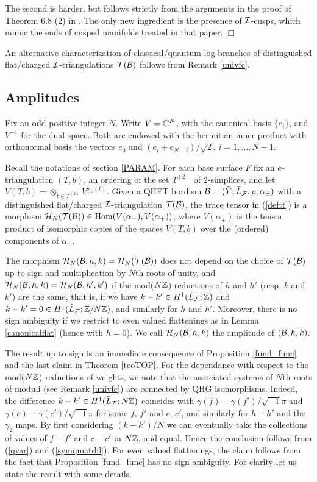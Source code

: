 The second is harder, but follows strictly from the arguments in
the proof of Theorem 6.8 (2) in \cite{BB2}. The only new
ingredient is the presence of ${\mathcal I}$-cusps, which mimic the ends of
cusped manifolds treated in that paper. \hfill$\Box$

An alternative characterization of classical/quantum log-branches
of distinguished flat/charged ${\mathcal I}$-triangulations ${\mathcal T}({\mathcal B})$
follows from Remark \ref{univfc}.
\subsection{Amplitudes}\label{QHFTTENS} Fix an odd positive integer $N$.
Write $V={\mathbb C}^N$, with the canonical basis $\{e_i\}$, and $V^{-1}$
for the dual space. Both are endowed with the hermitian inner
product with orthonormal basis the vectors $e_0$ and
$(e_i+e_{N-i})/\sqrt{2}$, $i=1,\ldots,N-1$.

Recall the notations of section \ref{PARAM}. For each base surface
$F$ fix an $e$-triangulation $(T,b)$, an ordering of the set
$T^{(2)}$ of $2$-simplices, and let $V(T,b) = \otimes_{t\in
T^{(2)}} V^{\sigma_\pm (t)}$. Given a QHFT bordism
${\mathcal B}=(\tilde{Y},\tilde{L}_{\mathcal F},\rho,\alpha_\pm)$ with a
distinguished flat/charged ${\mathcal I}$-triangulation ${\mathcal T}({\mathcal B})$, the
trace tensor in (\ref{deftt}) is a morphism ${\mathcal H}_N({\mathcal T}({\mathcal B})) \in
{\rm Hom}(V(\alpha_-),V(\alpha_+))$, where $V(\alpha_\pm)$ is the
tensor product of isomorphic copies of the spaces $V(T,b)$ over
the (ordered) components of $\alpha_\pm$.
\begin{teo}\label{main} The morphism ${\mathcal H}_N({\mathcal B},h,k)={\mathcal H}_N({\mathcal T}({\mathcal B}))$ does not
depend on the choice of ${\mathcal T}({\mathcal B})$ up to sign and multiplication by
$N$th roots of unity, and ${\mathcal H}_N({\mathcal B},h,k)={\mathcal H}_N({\mathcal B},h',k')$ if the
mod($N\mathbb{Z}$) reductions of $h$ and $h'$ (resp. $k$ and $k'$) are the
same, that is, if we have $k-k' \in H^1(\tilde{L}_{\mathcal F};\mathbb{Z})$ and $k-k'=0 \in
H^1(\tilde{L}_{\mathcal F};\mathbb{Z}/N\mathbb{Z})$, and similarly for $h$ and $h'$. Moreover,
there is no sign ambiguity if we restrict to even valued flattenings
as in Lemma \ref{canonicalflat} (hence with $h=0$). We call
${\mathcal H}_N({\mathcal B},h,k)$ the {\rm amplitude} of $({\mathcal B},h,k)$.
\end{teo}
 The result up to sign is an immediate
consequence of Proposition \ref{fund_func} and the last claim in
Theorem \ref{teoTOP}. For the dependance with respect to the
mod($N\mathbb{Z}$) reductions of weights, we note that the associated systems
of $N$th roots of moduli (see Remark \ref{univfc}) are connected by
QHG isomorphisms. Indeed, the difference $k-k' \in
H^1(\tilde{L}_{\mathcal F};N\mathbb{Z})$ coincides with $\gamma(f) -
\gamma(f')/\sqrt{-1}\pi$ and $\gamma(c) - \gamma(c')/\sqrt{-1}\pi$ for
some $f$, $f'$ and $c$, $c'$, and similarly for $h-h'$ and the
$\gamma_2$ maps. By first considering $(k-k')/N$ we can eventually
take the collections of values of $f-f'$ and $c-c'$ in $N\mathbb{Z}$, and
equal. Hence the conclusion follows from (\ref{qvar}) and
(\ref{symqmatdil}). For even valued flattenings, the
claim follows from the fact that Proposition \ref{fund_func} has no
sign ambiguity. For clarity let us state the result with some details.

